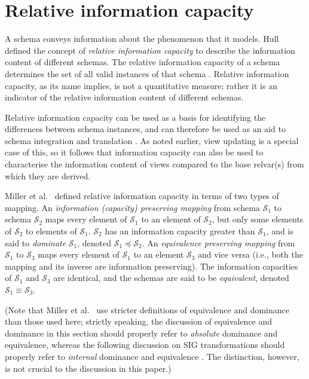 \documentclass{sig-alternate-05-2015}
\newcommand{\SC}[1]{\ensuremath{\mathcal{S}_{#1}}}
\newcommand{\Dominates}[2]{\ensuremath{#2 \preceq #1}}
\newcommand{\Equivalent}[2]{\ensuremath{#1 \equiv #2}}
\begin{document}



\section{Relative information capacity}
\label{sec-info-capacity}

\noindent A schema conveys information about the phenomenon that it models. Hull \cite{Hull.R-1986a-Relative} defined the concept of \emph{relative information capacity} to describe the information content of different schemas. The relative information capacity of a schema determines the set of all valid instances of that schema \cite{Hull.R-1986a-Relative,Miller.R-1994a-PhD,Miller.R-1993a-Information}. Relative information capacity, as its name implies, is not a quantitative measure; rather it is an indicator of the relative information content of different schemas.

Relative information capacity can be used as a basis for identifying the differences between schema instances, and can therefore be used as an aid to schema integration and translation \cite{Miller.R-1994a-PhD}. As noted earlier, view updating is a special case of this, so it follows that information capacity can also be used to characterise the information content of views compared to the base relvar(s) from which they are derived.

Miller et al.\ \cite{Miller.R-1993a-Information} defined relative information capacity in terms of two types of mapping. An \emph{information (capacity) preserving mapping} from schema \(\SC{1}\) to schema \(\SC{2}\) maps every element of \(\SC{1}\) to an element of \(\SC{2}\), but only some elements of \(\SC{2}\) to elements of \(\SC{1}\). \(\SC{2}\) has an information capacity greater than \(\SC{1}\), and is said to \emph{dominate} \(\SC{1}\), denoted \Dominates{\SC{2}}{\SC{1}}. An \emph{equivalence preserving mapping} from \(\SC{1}\) to \(\SC{3}\) maps every element of \(\SC{1}\) to an element \(\SC{3}\) and vice versa (i.e., both the mapping and its inverse are information preserving). The information capacities of \(\SC{1}\) and \(\SC{3}\) are identical, and the schemas are said to be \emph{equivalent}, denoted \Equivalent{\SC{1}}{\SC{3}}.

(Note that Miller et al.\ \cite{Miller.R-1994a-Schema} use stricter definitions of equivalence and dominance than those used here; strictly speaking, the discussion of equivalence and dominance in this section should properly refer to \emph{absolute} dominance and equivalence, whereas the following discussion on SIG transformations should properly refer to \emph{internal} dominance and equivalence \cite{Miller.R-1994a-Schema}. The distinction, however, is not crucial to the discussion in this paper.)
\end{document}

